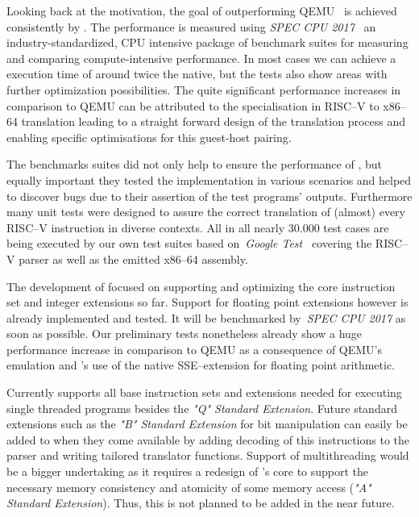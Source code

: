 Looking back at the motivation, the goal of outperforming QEMU~\cite{bellard2005qemu} is achieved consistently by \translatorname.
The performance is measured using \textit{SPEC CPU 2017}~\cite{spec-cpu-2017} an industry-standardized, CPU intensive package of benchmark suites for measuring and comparing compute-intensive performance.
In most cases we can achieve a execution time of around twice the native, but the tests also show areas with further optimization possibilities. %
The quite significant performance increases in comparison to QEMU can be attributed to the specialisation in RISC--V to x86--64 translation leading to a straight forward design of the translation process and enabling specific optimisations for this guest-host pairing.

The benchmarks suites did not only help to ensure the performance of \translatorname, but equally important they tested the implementation in various scenarios and helped to discover bugs due to their assertion of the test programs' outputs.
Furthermore many unit tests were designed to assure the correct translation of (almost) every RISC--V instruction in diverse contexts.
All in all nearly 30.000 test cases are being executed by our own test suites based on~\textit{Google Test}~\cite{gtest} covering the RISC--V parser as well as the emitted x86--64 assembly.

The development of \translatorname focused on supporting and optimizing the core instruction set and integer extensions so far.
Support for floating point extensions however is already implemented and tested.
It will be benchmarked by~\textit{SPEC CPU 2017} as soon as possible.
Our preliminary tests nonetheless already show a huge performance increase in comparison to QEMU as a consequence of QEMU's emulation and \translatorname's use of the native SSE--extension for floating point arithmetic.


Currently \translatorname supports all base instruction sets and extensions needed for executing single threaded programs besides the \textit{"Q" Standard Extension}.
Future standard extensions such as the \textit{"B" Standard Extension} for bit manipulation can easily be added to \translatorname when they come available by adding decoding of this instructions to the parser and writing tailored translator functions.
Support of multithreading would be a bigger undertaking as it requires a redesign of \translatorname's core to support the necessary memory consistency and atomicity of some memory access (\textit{"A" Standard Extension}).
Thus, this is not planned to be added in the near future.

